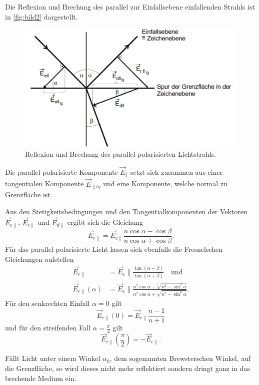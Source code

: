 Die Reflexion und Brechung des parallel zur Einfallsebene einfallenden Strahls ist in \autoref{fig:bild2} dargestellt.

\begin{figure}[H]
	\centering
	\includegraphics[width=0.9\linewidth]{content/grafik/bild2.png}
	\caption{Reflexion und Brechung des parallel polarisierten Lichtstrahls. \cite{fresnel}}
	\label{fig:bild2}
\end{figure}

Die parallel polarisierte Komponente $\vec{E}_{\|}$ setzt sich zusammen aus einer tangentialen Komponente $\vec{E}_{\|tg}$
und eine Komponente, welche normal zu Grenzfläche ist.

Aus den Stetigkeitsbedingungen und den Tangentialkomponenten der Vektoren $\vec{E}_{e\|}$, $\vec{E}_{r\|}$ und $\vec{E}_{d\|}$
ergibt sich die Gleichung
\begin{equation}
    \vec{E}_{r\|} = \vec{E}_{e\|} \frac{n \cos \alpha - \cos \beta}{n \cos \alpha + \cos \beta}.
    \label{eqn:keinname}
\end{equation}
Für das parallel polarisierte Licht lassen sich ebenfalls die Fresnelschen Gleichungen aufstellen
\begin{equation}
    \begin{aligned}
    \vec{E}_{r \|}&=\vec{E}_e \| \frac{\tan (\alpha-\beta)}{\tan (\alpha+\beta)} \quad \text{und}\\
    \vec{E}_{r \|}(\alpha)&=\vec{E}_e \| \frac{n^2 \cos \alpha-\sqrt{n^2-\sin ^2 \alpha}}{n^2 \cos \alpha+\sqrt{n^2-\sin ^2 \alpha}} .
    \label{eqn:fresnel2}
    \end{aligned}
\end{equation}
Für den senkrechten Einfall $ \alpha = 0$ gilt
\begin{equation*}
    \vec{E}_{r\|}(0) = \vec{E}_{e\|} \frac{n - 1}{n + 1}
\end{equation*}
und für den streifenden Fall $\alpha= \frac{\pi}{2}$ gilt
\begin{equation*}
    \vec{E}_{r\|}(\frac{\pi}{2}) = -\vec{E}_{e\|}.
\end{equation*}

Fällt Licht unter einem Winkel $\alpha_0$, dem sogenannten Brewsterschen Winkel, auf die Grenzfläche, so wird dieses
nicht mehr reflektiert sondern dringt ganz in das brechende Medium ein.
